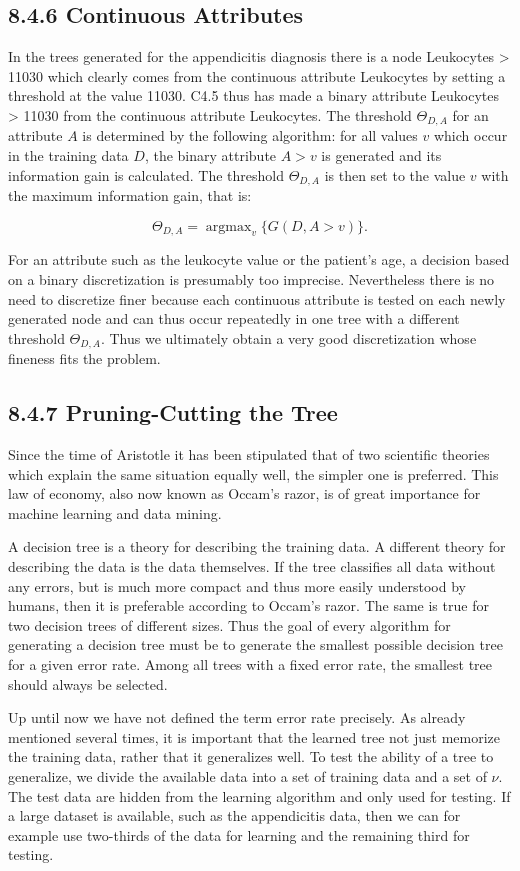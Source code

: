 \documentclass[10pt]{article}
\begin{document}
\subsection*{8.4.6 Continuous Attributes}
In the trees generated for the appendicitis diagnosis there is a node Leukocytes > 11030 which clearly comes from the continuous attribute Leukocytes by setting a threshold at the value 11030. C4.5 thus has made a binary attribute Leukocytes > 11030 from the continuous attribute Leukocytes. The threshold $\Theta_{D, A}$ for an attribute $A$ is determined by the following algorithm: for all values $v$ which occur in the training data $D$, the binary attribute $A>v$ is generated and its information gain is calculated. The threshold $\Theta_{D, A}$ is then set to the value $v$ with the maximum information gain, that is:

$$
\Theta_{D, A}=\operatorname{argmax}_{v}\{G(D, A>v)\} .
$$

For an attribute such as the leukocyte value or the patient's age, a decision based on a binary discretization is presumably too imprecise. Nevertheless there is no need to discretize finer because each continuous attribute is tested on each newly generated node and can thus occur repeatedly in one tree with a different threshold $\Theta_{D, A}$. Thus we ultimately obtain a very good discretization whose fineness fits the problem.

\subsection*{8.4.7 Pruning-Cutting the Tree}
Since the time of Aristotle it has been stipulated that of two scientific theories which explain the same situation equally well, the simpler one is preferred. This law of economy, also now known as Occam's razor, is of great importance for machine learning and data mining.

A decision tree is a theory for describing the training data. A different theory for describing the data is the data themselves. If the tree classifies all data without any errors, but is much more compact and thus more easily understood by humans, then it is preferable according to Occam's razor. The same is true for two decision trees of different sizes. Thus the goal of every algorithm for generating a decision tree must be to generate the smallest possible decision tree for a given error rate. Among all trees with a fixed error rate, the smallest tree should always be selected.

Up until now we have not defined the term error rate precisely. As already mentioned several times, it is important that the learned tree not just memorize the training data, rather that it generalizes well. To test the ability of a tree to generalize, we divide the available data into a set of training data and a set of $\nu$. The test data are hidden from the learning algorithm and only used for testing. If a large dataset is available, such as the appendicitis data, then we can for example use two-thirds of the data for learning and the remaining third for testing.
\end{document}
